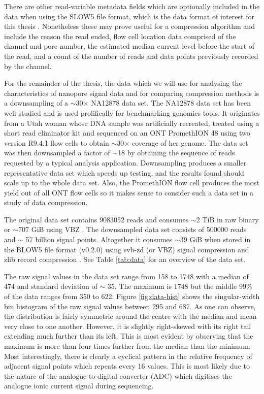 There are other read-variable metadata fields which are optionally included in the data when using the SLOW5 file format, which is the data format of interest for this thesis \cite{slow5}. Nonetheless these may prove useful for a compression algorithm and include the reason the read ended, flow cell location data comprised of the channel and pore number, the estimated median current level before the start of the read, and a count of the number of reads and data points previously recorded by the channel.

For the remainder of the thesis, the data which we will use for analysing the characteristics of nanopore signal data and for comparing compression methods is a downsampling of a $\sim$30$\times$ NA12878 data set. The NA12878 data set has been well studied and is used prolifically for benchmarking genomics tools. It originates from a Utah woman whose DNA sample was artificially recreated, treated using a short read eliminator kit and sequenced on an ONT PromethION 48 using two version R9.4.1 flow cells to obtain $\sim$30$\times$ coverage of her genome. The data set was then downsampled a factor of $\sim$18 by obtaining the sequence of reads requested by a typical analysis application.
Downsampling produces a smaller representative data set which speeds up testing, and the results found should scale up to the whole data set.
Also, the PromethION flow cell produces the most yield out of all ONT flow cells so it makes sense to consider such a data set in a study of data compression.

The original data set contains \num{9083052} reads and consumes $\sim$2 TiB in raw binary or $\sim$707 GiB using VBZ \cite{slow5}. The downsampled data set consists of \num{500000} reads and $\sim$ 57 billion signal points. Altogether it consumes $\sim$39 GiB when stored in the BLOW5 file format (v0.2.0) using svb-zd (or VBZ) signal compression and zlib record compression \cite{slow5}. See Table \ref{tab:data} for an overview of the data set.



The raw signal values in the data set range from 158 to 1748 with a median of 474 and standard deviation of $\sim$ 35. The maximum is 1748 but the middle 99\% of the data ranges from 350 to 622. Figure \ref{fig:data-hist} shows the singular-width bin histogram of the raw signal values between 295 and 687.
As one can observe, the distribution is fairly symmetric around the centre with the median and mean very close to one another. However, it is slightly right-skewed with its right tail extending much further than its left. This is most evident by observing that the maximum is more than four times further from the median than the minimum.
Most interestingly, there is clearly a cyclical pattern in the relative frequency of adjacent signal points which repeats every 16 values.
This is most likely due to the nature of the analogue-to-digital converter (ADC) which digitises the analogue ionic current signal during sequencing.

